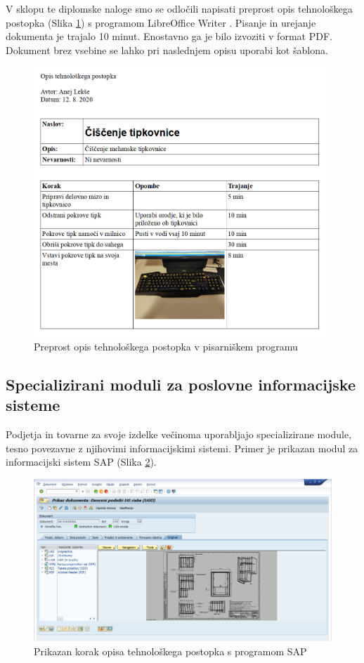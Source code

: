 \documentclass[a4paper, 12pt]{book}
\begin{document}
V sklopu te diplomske naloge smo se odločili napisati preprost opis tehnološkega postopka (Slika \ref{report_writer}) s programom LibreOffice Writer \cite{writer}.
Pisanje in urejanje dokumenta je trajalo 10 minut.
Enostavno ga je bilo izvoziti v format PDF.
Dokument brez vsebine se lahko pri naslednjem opisu uporabi kot šablona.

\begin{figure}[H]
\begin{center}
\includegraphics[width=11cm]{report_writer}
\end{center}
\caption{Preprost opis tehnološkega postopka v pisarniškem programu}
\label{report_writer}
\end{figure}

\subsection{Specializirani moduli za poslovne informacijske sisteme}

Podjetja in tovarne za svoje izdelke večinoma uporabljajo specializirane module, tesno povezavne z njihovimi informacijskimi sistemi.
Primer je prikazan modul za informacijski sistem SAP (Slika \ref{sap_1}).

\begin{figure}[H]
\begin{center}
\includegraphics[width=13cm]{sap_1}
\end{center}
\caption{Prikazan korak opisa tehnološkega postopka s programom SAP}
\label{sap_1}
\end{figure}
\end{document}
